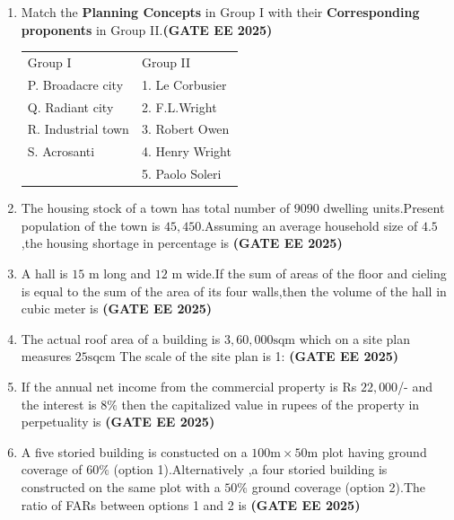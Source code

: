 \documentclass[journal,12pt,onecolumn]{IEEEtran}
\theoremstyle{remark}
\begin{document}
\begin{enumerate}
\begin{enumerate}
\begin{multicols}{2}
    \end{multicols}
\end{enumerate}
\item Match the \textbf{Planning Concepts} in Group I with their \textbf{Corresponding proponents} in Group II.\hfill \textbf{(GATE EE 2025)}
\begin{tabular}{p{}p{}}
Group I  & Group II\\
P. Broadacre city     &1. Le Corbusier  \\
Q. Radiant city     & 2. F.L.Wright\\
R. Industrial town & 3. Robert Owen\\
S. Acrosanti  & 4. Henry Wright\\
    & 5. Paolo Soleri\\
\end{tabular}
\begin{enumerate}
\end{enumerate}
\item The housing stock of a town has total number of $9090$ dwelling units.Present population of the town is $45,450$.Assuming an average household size of $4.5$,the housing shortage in percentage is \underline{\makebox[2cm]{\hfill}} \hfill \textbf{(GATE EE 2025)}
\item A hall is $15$ m long and $12$ m wide.If the sum of areas of the floor and cieling is equal to the sum of the area of its four walls,then the volume of the hall in cubic meter is \underline{\makebox[2cm]{\hfill}} \hfill \textbf{(GATE EE 2025)}
\item The actual roof area of a building is $3,60,000\text{sqm}$ which on a site plan measures $25\text{sqcm}$ The scale of the site plan is 1:\underline{\makebox[2cm]{\hfill}} \hfill \textbf{(GATE EE 2025)}
\item If the annual net income from the commercial property is Rs $22,000$/- and the interest is $8\%$ then the capitalized value in rupees of the property in perpetuality is \underline{\makebox[2cm]{\hfill}} \hfill \textbf{(GATE EE 2025)}
\item A five storied building is constucted on a $100\text{m} \times 50\text{m}$ plot having ground coverage of $60\%$ (option 1).Alternatively ,a four storied building is constructed on the same plot with a $50\%$ ground coverage (option 2).The ratio of FARs between options 1 and 2 is \underline{\makebox[2cm]{\hfill}} \hfill \textbf{(GATE EE 2025)}

\end{enumerate}
\end{document}
